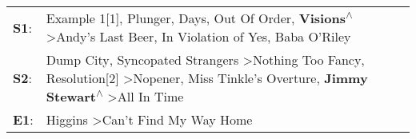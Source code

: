 \begin{supertabular}{p{0.03\textwidth}p{0.92\textwidth}}
 \textbf{S1}:  &                                              Example 1[1]\textsuperscript{}, \enspace Plunger\textsuperscript{},  Days\textsuperscript{}, \enspace Out Of Order\textsuperscript{}, \enspace \textbf{Visions\textsuperscript{$\wedge$}} \textgreater \enspace Andy's Last Beer\textsuperscript{}, \enspace In Violation of Yes\textsuperscript{}, \enspace Baba O'Riley\textsuperscript{}  \enspace  \\
 \textbf{S2}:  &  Dump City\textsuperscript{}, \enspace Syncopated Strangers\textsuperscript{} \textgreater \enspace Nothing Too Fancy\textsuperscript{}, \enspace Resolution[2]\textsuperscript{} \textgreater \enspace Nopener\textsuperscript{}, \enspace Miss Tinkle's Overture\textsuperscript{}, \enspace \textbf{Jimmy Stewart\textsuperscript{$\wedge$}} \textgreater \enspace All In Time\textsuperscript{}  \enspace  \\
 \textbf{E1}:  &                                                                                                                                                                                                                                                                                                            Higgins\textsuperscript{} \textgreater \enspace Can't Find My Way Home\textsuperscript{}  \enspace  \\
\end{supertabular}
